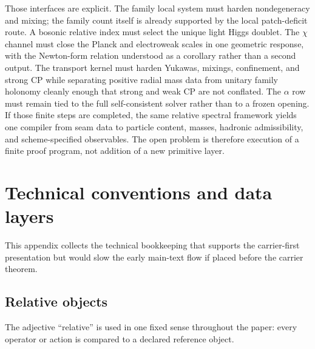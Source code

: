 \documentclass[11pt,a4paper]{article}
\theoremstyle{definition}
\theoremstyle{remark}
\begin{document}
Those interfaces are explicit. The family local system must harden nondegeneracy and mixing; the family count itself is already supported by the local patch-deficit route. A bosonic relative index must select the unique light Higgs doublet. The $\chi$ channel must close the Planck and electroweak scales in one geometric response, with the Newton-form relation understood as a corollary rather than a second output. The transport kernel must harden Yukawas, mixings, confinement, and strong CP while separating positive radial mass data from unitary family holonomy cleanly enough that strong and weak CP are not conflated. The $\alpha$ row must remain tied to the full self-consistent solver rather than to a frozen opening. If those finite steps are completed, the same relative spectral framework yields one compiler from seam data to particle content, masses, hadronic admissibility, and scheme-specified observables. The open problem is therefore execution of a finite proof program, not addition of a new primitive layer.

\appendix

\section{Technical conventions and data layers}
\label{app:tech}

This appendix collects the technical bookkeeping that supports the carrier-first presentation but would slow the early main-text flow if placed before the carrier theorem.

\subsection{Relative objects}

The adjective \enquote{relative} is used in one fixed sense throughout the paper: every operator or action is compared to a declared reference object.
\end{document}
